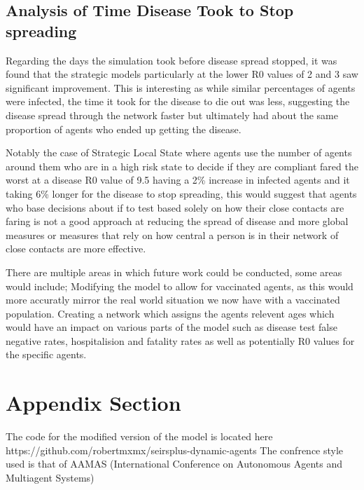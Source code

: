 \documentclass{article}
\begin{document}
\subsection{Analysis of Time Disease Took to Stop spreading}

Regarding the days the simulation took before disease spread stopped, it was found that the strategic models particularly at the lower R0 values of 2 and 3 saw significant improvement. This is interesting as while similar percentages of agents were infected, the time it took for the disease to die out was less, suggesting the disease spread through the network faster but ultimately had about the same proportion of agents who ended up getting the disease.\newline 

Notably the case of Strategic Local State where agents use the number of agents around them who are in a high risk state to decide if they are compliant fared the worst at a disease R0 value of 9.5 having a 2\% increase in infected agents and it taking 6\% longer for the disease to stop spreading, this would suggest that agents who base decisions about if to test based solely on how their close contacts are faring is not a good approach at reducing the spread of disease and more global measures or measures that rely on how central a person is in their network of close contacts are more effective. \newline 

There are multiple areas in which future work could be conducted, some areas would include; Modifying the model to allow for vaccinated agents, as this would more accuratly mirror the real world situation we now have with a vaccinated population. Creating a network which assigns the agents relevent ages which would have an impact on various parts of the model such as disease test false negative rates, hospitalision and fatality rates as well as potentially R0 values for the specific agents.


\newpage
\appendix

\section{Appendix Section}
The code for the modified version of the model is located here https://github.com/robertmxmx/seirsplus-dynamic-agents
The confrence style used is that of AAMAS (International Conference on Autonomous Agents and Multiagent Systems) 


{}

\end{document}
